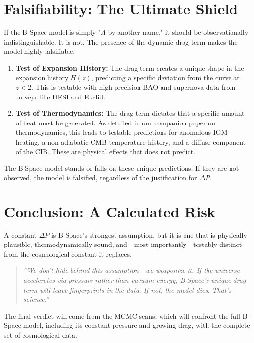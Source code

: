 \documentclass{BSpacePaper} %
\begin{document}
\section{Falsifiability: The Ultimate Shield}
If the B-Space model is simply "\(\Lambda\) by another name," it should be observationally indistinguishable. It is not. The presence of the dynamic drag term makes the model highly falsifiable.
\begin{enumerate}
    \item \textbf{Test of Expansion History:} The drag term creates a unique shape in the expansion history $H(z)$, predicting a specific deviation from the \lcdm{} curve at $z < 2$. This is testable with high-precision BAO and supernova data from surveys like DESI and Euclid.
    \item \textbf{Test of Thermodynamics:} The drag term dictates that a specific amount of heat must be generated. As detailed in our companion paper on thermodynamics, this leads to testable predictions for anomalous IGM heating, a non-adiabatic CMB temperature history, and a diffuse component of the CIB. These are physical effects that \lcdm{} does not predict.
\end{enumerate}
The B-Space model stands or falls on these unique predictions. If they are not observed, the model is falsified, regardless of the justification for $\Delta P$.

\section{Conclusion: A Calculated Risk}
A constant $\Delta P$ is B-Space’s strongest assumption, but it is one that is physically plausible, thermodynamically sound, and—most importantly—testably distinct from the cosmological constant it replaces.
\begin{center}
\begin{minipage}{0.9\textwidth}
\centering
\begin{quote}
\textit{“We don’t hide behind this assumption—we weaponize it. If the universe accelerates via pressure rather than vacuum energy, B-Space's unique drag term will leave fingerprints in the data. If not, the model dies. That’s science.”}
\end{quote}
\end{minipage}
\end{center}
The final verdict will come from the MCMC scans, which will confront the full B-Space model, including its constant pressure and growing drag, with the complete set of cosmological data.
\end{document}
